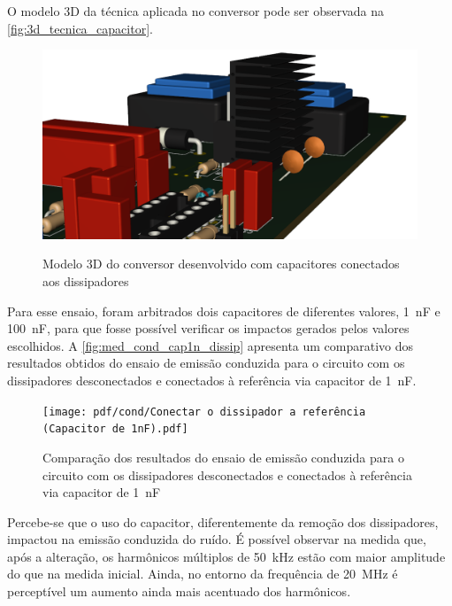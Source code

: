     
    O modelo 3D da técnica aplicada no conversor pode ser observada na \autoref{fig:3d_tecnica_capacitor}.
    
    \begin{figure}[H]
    	\centering
    	\caption{Modelo 3D do conversor desenvolvido com capacitores conectados aos dissipadores}
    	\includegraphics[scale=.35]{pdf/fotos/tecnica_capacitor.png}
        \label{fig:3d_tecnica_capacitor}
    \end{figure}
    
    Para esse ensaio, foram arbitrados dois capacitores de diferentes valores, \SI{1}{\nano\farad} e \SI{100}{\nano\farad}, para que fosse possível verificar os impactos gerados pelos valores escolhidos. A \autoref{fig:med_cond_cap1n_dissip} apresenta um comparativo dos resultados obtidos do ensaio de emissão conduzida para o circuito com os dissipadores desconectados e conectados à referência via capacitor de \SI{1}{\nano\farad}.
    
    \begin{figure}[H]
    	\centering
    	\caption{Comparação dos resultados do ensaio de emissão conduzida para o circuito com os dissipadores desconectados e conectados à referência via capacitor de \SI{1}{\nano\farad}}
    	\texttt{[image: pdf/cond/Conectar o dissipador a referência (Capacitor de 1nF).pdf]}
    	\label{fig:med_cond_cap1n_dissip}
    \end{figure}
    
    Percebe-se que o uso do capacitor, diferentemente da remoção dos dissipadores, impactou na emissão conduzida do ruído. É possível observar na medida que, após a alteração, os harmônicos múltiplos de \SI{50}{\kilo\hertz} estão com maior amplitude do que na medida inicial. Ainda, no entorno da frequência de \SI{20}{\mega\hertz} é perceptível um aumento ainda mais acentuado dos harmônicos. 
    
